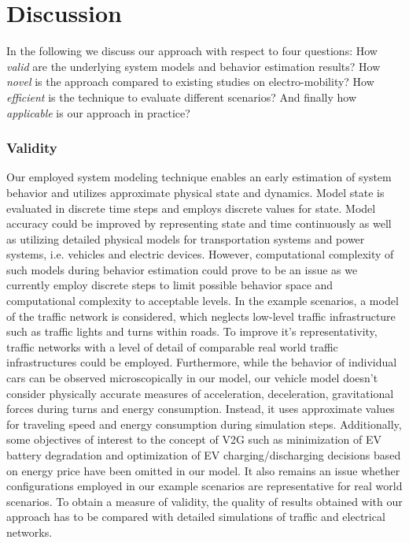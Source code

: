 \section{Discussion}
\label{section:discussion}
In the following we discuss our approach with respect to four questions: How \textit{valid} are the underlying system models and behavior estimation results? How \textit{novel} is the approach compared to existing studies on electro-mobility? How \textit{efficient} is the technique to evaluate different scenarios? And finally how \textit{applicable} is our approach in practice?
\subsubsection*{Validity}

Our employed system modeling technique enables an early estimation of system behavior and utilizes approximate physical state and dynamics. Model state is evaluated in discrete time steps and employs discrete values for state. Model accuracy could be improved by representing state and time continuously as well as utilizing detailed physical models for transportation systems and power systems, i.e. vehicles and electric devices. However, computational complexity of such models during behavior estimation could prove to be an issue as we currently employ discrete steps to limit possible behavior space and computational complexity to acceptable levels.
In the example scenarios, a model of the traffic network is considered, which neglects low-level traffic infrastructure such as traffic lights and turns within roads. To improve it's representativity, traffic networks with a level of detail of comparable real world traffic infrastructures could be employed. Furthermore, while the behavior of individual cars can be observed microscopically in our model, our vehicle model doesn't consider physically accurate measures of acceleration, deceleration, gravitational forces during turns and energy consumption. Instead, it uses approximate values for traveling speed and energy consumption during simulation steps. Additionally, some objectives of interest to the concept of V2G such as minimization of EV battery degradation and optimization of EV charging/discharging decisions based on energy price have been omitted in our model.
It also remains an issue whether configurations employed in our example scenarios are representative for real world scenarios. To obtain a measure of validity, the quality of results obtained with our approach has to be compared with detailed simulations of traffic and electrical networks.

